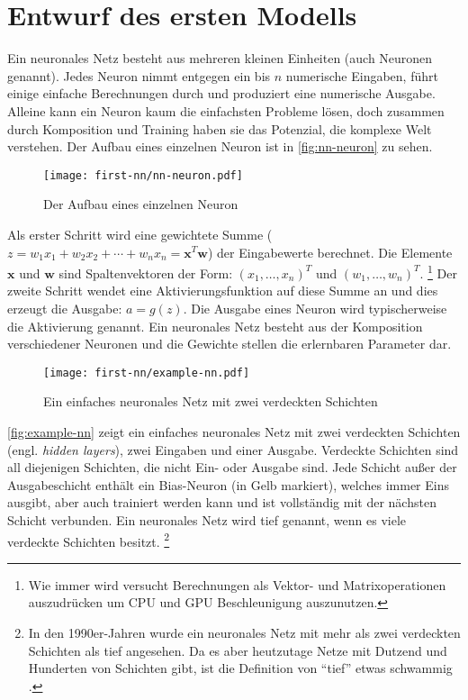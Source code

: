 \section{Entwurf des ersten Modells}
Ein neuronales Netz besteht aus mehreren kleinen Einheiten (auch Neuronen genannt).
Jedes Neuron nimmt entgegen ein bis $n$ numerische Eingaben, führt einige
einfache Berechnungen durch und produziert eine numerische Ausgabe.
Alleine kann ein Neuron kaum die einfachsten Probleme lösen, doch zusammen
durch Komposition und Training haben sie das Potenzial,
die komplexe Welt verstehen.
Der Aufbau eines einzelnen Neuron ist in \autoref{fig:nn-neuron} zu sehen.
\newpage
\begin{figure}[h!]
  \centering
  \texttt{[image: first-nn/nn-neuron.pdf]}
  \caption{Der Aufbau eines einzelnen Neuron}
  \label{fig:nn-neuron}
\end{figure}
\noindent
Als erster Schritt wird eine gewichtete Summe
($z = w_1x_1 + w_2x_2 +\dotsb+ w_nx_n = \mathbf{x}^T\mathbf{w}$)
der Eingabewerte berechnet. Die Elemente $\mathbf{x}$ und $\mathbf{w}$
sind Spaltenvektoren der Form: $(x_1,\dotsc,x_n)^T$ und $(w_1,\dotsc,w_n)^T$.
\footnote{Wie immer wird versucht Berechnungen als Vektor- und Matrixoperationen
auszudrücken um CPU und GPU Beschleunigung auszunutzen.}
Der zweite Schritt wendet eine Aktivierungsfunktion auf diese Summe an und dies
erzeugt die Ausgabe: $a = g(z)$. Die Ausgabe eines Neuron
wird typischerweise die Aktivierung genannt. Ein neuronales Netz
besteht aus der Komposition verschiedener Neuronen und die
Gewichte stellen die erlernbaren Parameter dar.
\begin{figure}[h!]
  \centering
  \texttt{[image: first-nn/example-nn.pdf]}
  \caption{Ein einfaches neuronales Netz mit zwei verdeckten Schichten}
  \label{fig:example-nn}
\end{figure}
\noindent
\autoref{fig:example-nn} zeigt ein einfaches neuronales Netz
mit zwei verdeckten Schichten (engl. \textit{hidden layers}),
zwei Eingaben und einer Ausgabe.
Verdeckte Schichten sind all diejenigen Schichten, die nicht Ein- oder Ausgabe sind.
Jede Schicht außer der Ausgabeschicht enthält ein Bias-Neuron
(in Gelb markiert), welches immer Eins ausgibt, aber auch trainiert werden kann
und ist vollständig mit der nächsten Schicht verbunden.
Ein neuronales Netz wird tief genannt, wenn es viele verdeckte Schichten besitzt.
\footnote{In den 1990er-Jahren wurde ein neuronales Netz
mit mehr als zwei verdeckten Schichten als tief angesehen.
Da es aber heutzutage Netze mit Dutzend und Hunderten von Schichten
gibt, ist die Definition von \enquote{tief} etwas schwammig \parencite[289]{book:hands-on-ml}.}
